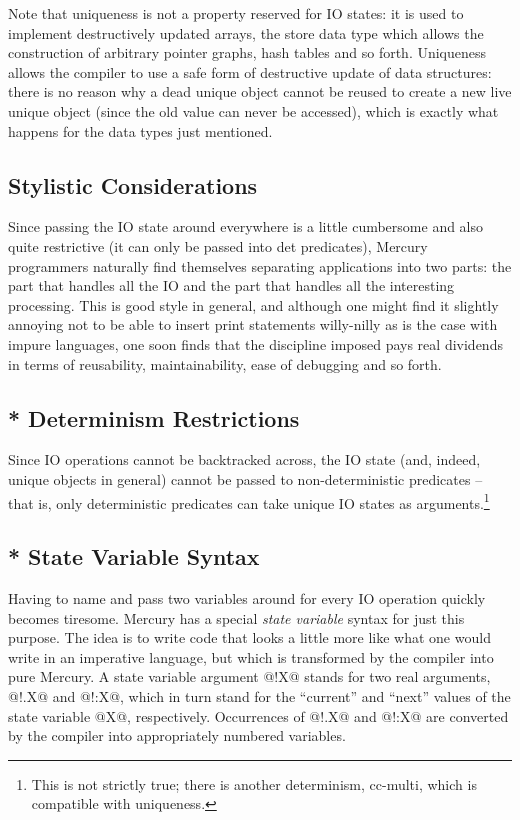 Note that uniqueness is not a property reserved for IO states:
it is used to implement destructively updated arrays, the
store data type which allows the construction of arbitrary
pointer graphs, hash tables and so forth.  Uniqueness allows
the compiler to use a safe form of destructive update of data
structures: there is no reason why a dead unique object cannot
be reused to create a new live unique object (since the old
value can never be accessed), which is exactly what happens
for the data types just mentioned.

\subsection{Stylistic Considerations}

Since passing the IO state around everywhere is a little
cumbersome and also quite restrictive (it can only be passed
into det predicates), Mercury programmers naturally find
themselves separating applications into two parts: the part
that handles all the IO and the part that handles all the
interesting processing.  This is good style in general, and
although one might find it slightly annoying not to be able to
insert print statements willy-nilly as is the case with impure
languages, one soon finds that the discipline imposed pays
real dividends in terms of reusability, maintainability, ease
of debugging and so forth.

\subsection{* Determinism Restrictions}

Since IO operations cannot be backtracked across, the IO state
(and, indeed, unique objects in general) cannot be passed to
non-deterministic predicates -- that is, only deterministic
predicates can take unique IO states as arguments.\footnote{This is not strictly true; there is another
determinism, cc-multi, which is compatible with uniqueness.}

\subsection{* State Variable Syntax}

Having to name and pass two variables around for every IO
operation quickly becomes tiresome.  Mercury has a special
\emph{state variable} syntax for just this purpose.  The idea is to
write code that looks a little more like what one would write
in an imperative language, but which is transformed by the
compiler into pure Mercury.  A state variable argument @!X@
stands for two real arguments, @!.X@ and @!:X@, which in turn
stand for the ``current'' and ``next'' values of the state variable
@X@, respectively.  Occurrences of @!.X@ and @!:X@ are converted by
the compiler into appropriately numbered variables.

